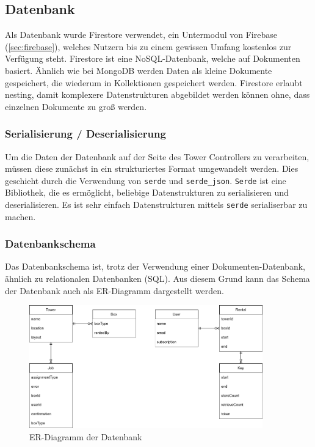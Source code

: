 \subsection{Datenbank}

Als Datenbank wurde Firestore verwendet, ein Untermodul von Firebase (\ref{sec:firebase}), welches Nutzern bis zu einem gewissen Umfang kostenlos zur Verfügung steht. Firestore ist eine \Gls{NoSQL}-Datenbank, welche auf Dokumenten basiert. Ähnlich wie bei \Gls{MongoDB} werden Daten als kleine Dokumente gespeichert, die wiederum in Kollektionen gespeichert werden. Firestore erlaubt \gls{nesting}, damit komplexere Datenstrukturen abgebildet werden können ohne, dass einzelnen Dokumente zu groß werden.


\subsubsection{\Gls{Serialisierung} / \Gls{Deserialisierung}}

Um die Daten der Datenbank auf der Seite des Tower Controllers zu verarbeiten, müssen diese zunächst in ein strukturiertes Format umgewandelt werden. Dies geschieht durch die Verwendung von \texttt{serde} und \texttt{serde\_json}. \texttt{Serde} ist eine Bibliothek, die es ermöglicht, beliebige Datenstrukturen zu serialisieren und deserialisieren. Es ist sehr einfach Datenstrukturen mittels \texttt{serde} serialiserbar zu machen.


\subsubsection{Datenbankschema}
Das Datenbankschema ist, trotz der Verwendung einer Dokumenten-Datenbank, ähnlich zu \gls{relational}en Datenbanken (SQL). Aus diesem Grund kann das Schema der Datenbank auch als \ac{ER}-Diagramm dargestellt werden.

\begin{figure}[H]
    \centering
    \includegraphics[width=0.9\textwidth]{images/datenbankstruktur.png}
    \caption{\ac{ER}-Diagramm der Datenbank}
    \label{fig:er_diagramm}
\end{figure}

